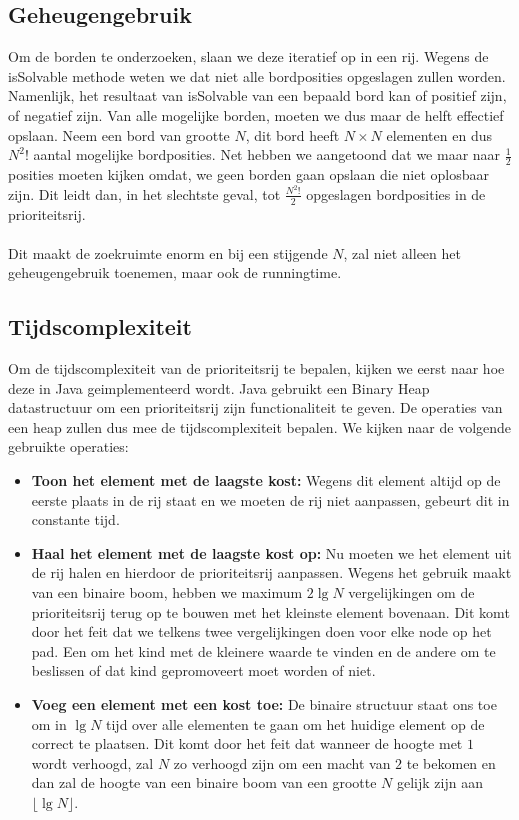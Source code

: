 \documentclass[a4paper]{article}
\numberwithin{equation}{section}
\begin{document}
            
    \pagebreak

        \subsection{Geheugengebruik}
        Om de borden te onderzoeken, slaan we deze iteratief op in een rij. Wegens de isSolvable methode weten we dat niet alle bordposities opgeslagen zullen worden. 
        Namenlijk, het resultaat van isSolvable van een bepaald bord kan of positief zijn, of negatief zijn. Van alle mogelijke borden, moeten we dus maar de helft effectief opslaan.
        Neem een bord van grootte $N$, dit bord heeft $N \times N$ elementen en dus $N^2!$ aantal mogelijke bordposities. Net hebben we aangetoond dat we maar naar $\frac{1}{2}$ posities moeten kijken omdat, we geen borden gaan opslaan die niet oplosbaar zijn.
        Dit leidt dan, in het slechtste geval, tot $\frac{N^2!}{2}$ opgeslagen bordposities in de prioriteitsrij.
        \\
        \\Dit maakt de zoekruimte enorm en bij een stijgende $N$, zal niet alleen het geheugengebruik toenemen, maar ook de runningtime.

        \subsection{Tijdscomplexiteit}
        Om de tijdscomplexiteit van de prioriteitsrij te bepalen, kijken we eerst naar hoe deze in Java geimplementeerd wordt.
        Java gebruikt een Binary Heap datastructuur om een prioriteitsrij zijn functionaliteit te geven. De operaties van een heap zullen dus mee de tijdscomplexiteit bepalen.
        We kijken naar de volgende gebruikte operaties:
        \begin{itemize}
            \item \textbf{Toon het element met de laagste kost:} Wegens dit element altijd op de eerste plaats in de rij staat en we moeten de rij niet aanpassen, gebeurt dit in constante tijd.
            \item \textbf{Haal het element met de laagste kost op:} Nu moeten we het element uit de rij halen en hierdoor de prioriteitsrij aanpassen. Wegens het gebruik maakt van een binaire boom, hebben we maximum $2 \lg N$ vergelijkingen om de prioriteitsrij terug op te bouwen met het kleinste element bovenaan. Dit komt door het feit dat we telkens twee vergelijkingen doen voor elke node op het pad. Een om het kind met de kleinere waarde te vinden en de andere om te beslissen of dat kind gepromoveert moet worden of niet.
            \item \textbf{Voeg een element met een kost toe:} De binaire structuur staat ons toe om in $\lg N$ tijd over alle elementen te gaan om het huidige element op de correct te plaatsen. Dit komt door het feit dat wanneer de hoogte met $1$ wordt verhoogd, zal $N$ zo verhoogd zijn om een macht van $2$ te bekomen en dan zal de hoogte van een binaire boom van een grootte $N$ gelijk zijn aan $\lfloor \lg N \rfloor$.
        \end{itemize}
        
\end{document}
